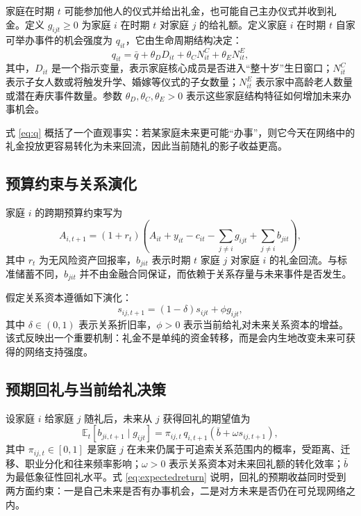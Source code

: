 \documentclass[12pt,a4paper]{ctexart}
\newcommand{\E}{\mathbb{E}}
\begin{document}
家庭在时期 $t$ 可能参加他人的仪式并给出礼金，也可能自己主办仪式并收到礼金。定义 $g_{ijt}\geq 0$ 为家庭 $i$ 在时期 $t$ 对家庭 $j$ 的给礼额。定义家庭 $i$ 在时期 $t$ 自家可举办事件的机会强度为 $q_{it}$，它由生命周期结构决定：
\begin{equation}
q_{it}=\bar{q}+\theta_D D_{it}+\theta_C N^C_{it}+\theta_E N^E_{it},
\label{eq:q}
\end{equation}
其中，$D_{it}$ 是一个指示变量，表示家庭核心成员是否进入“整十岁”生日窗口；$N^C_{it}$ 表示子女人数或将触发升学、婚嫁等仪式的子女数量；$N^E_{it}$ 表示家中高龄老人数量或潜在寿庆事件数量。参数 $\theta_D,\theta_C,\theta_E>0$ 表示这些家庭结构特征如何增加未来办事机会。

式 \eqref{eq:q} 概括了一个直观事实：若某家庭未来更可能“办事”，则它今天在网络中的礼金投放更容易转化为未来回流，因此当前随礼的影子收益更高。

\subsection{预算约束与关系演化}

家庭 $i$ 的跨期预算约束写为
\begin{equation}
A_{i,t+1}=(1+r_t)\left(A_{it}+y_{it}-c_{it}-\sum_{j\neq i} g_{ijt}+\sum_{j\neq i} b_{jit}\right),
\label{eq:budget}
\end{equation}
其中 $r_t$ 为无风险资产回报率，$b_{jit}$ 表示时期 $t$ 家庭 $j$ 对家庭 $i$ 的礼金回流。与标准储蓄不同，$b_{jit}$ 并不由金融合同保证，而依赖于关系存量与未来事件是否发生。

假定关系资本遵循如下演化：
\begin{equation}
s_{ij,t+1}=(1-\delta)s_{ijt}+\phi g_{ijt},
\label{eq:relation}
\end{equation}
其中 $\delta\in(0,1)$ 表示关系折旧率，$\phi>0$ 表示当前给礼对未来关系资本的增益。该式反映出一个重要机制：礼金不是单纯的资金转移，而是会内生地改变未来可获得的网络支持强度。

\subsection{预期回礼与当前给礼决策}

设家庭 $i$ 给家庭 $j$ 随礼后，未来从 $j$ 获得回礼的期望值为
\begin{equation}
\E_t[b_{ji,t+1}\mid g_{ijt}]
=\pi_{ij,t}\, q_{i,t+1}\left(\bar{b}+\omega s_{ij,t+1}\right),
\label{eq:expectedreturn}
\end{equation}
其中 $\pi_{ij,t}\in[0,1]$ 是家庭 $j$ 在未来仍属于可追索关系范围内的概率，受距离、迁移、职业分化和往来频率影响；$\omega>0$ 表示关系资本对未来回礼额的转化效率；$\bar{b}$ 为最低象征性回礼水平。式 \eqref{eq:expectedreturn} 说明，回礼的预期收益同时受到两方面约束：一是自己未来是否有办事机会，二是对方未来是否仍在可兑现网络之内。
\end{document}
